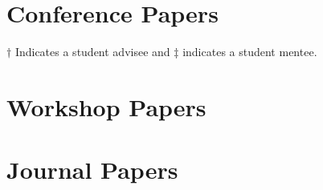 \documentclass[line]{res}
\begin{document}
\begin{resume}


%

\section{\large Conference Papers}
\indent $\dagger$ Indicates a student advisee and $\ddagger$ indicates a student mentee.

\vspace{0.1cm}

\vspace{-0.4cm}

\section{\large Workshop Papers} \vspace{0.3cm}

\vspace{-0.4cm}

\section{\large Journal Papers} \vspace{0.3cm}

\vspace{-0.4cm}


\end{resume}
\end{document}
